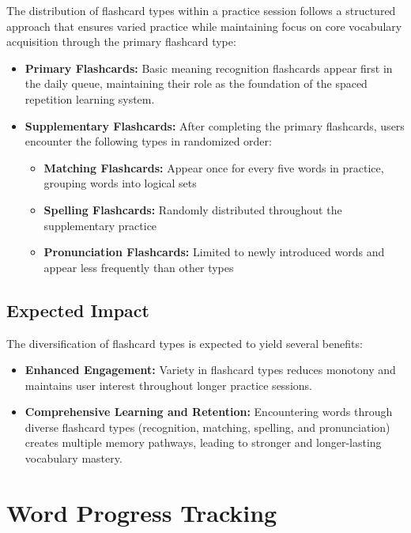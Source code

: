 The distribution of flashcard types within a practice session follows a structured approach that ensures varied practice while maintaining focus on core vocabulary acquisition through the primary flashcard type:

\begin{itemize}
    \item \textbf{Primary Flashcards:} Basic meaning recognition flashcards appear first in the daily queue, maintaining their role as the foundation of the spaced repetition learning system.
    
    \item \textbf{Supplementary Flashcards:} After completing the primary flashcards, users encounter the following types in randomized order:
    \begin{itemize}
        \item \textbf{Matching Flashcards:} Appear once for every five words in practice, grouping words into logical sets
        \item \textbf{Spelling Flashcards:} Randomly distributed throughout the supplementary practice
        \item \textbf{Pronunciation Flashcards:} Limited to newly introduced words and appear less frequently than other types
    \end{itemize}
\end{itemize}

\subsection*{Expected Impact}

The diversification of flashcard types is expected to yield several benefits:

\begin{itemize}
    \item \textbf{Enhanced Engagement:} Variety in flashcard types reduces monotony and maintains user interest throughout longer practice sessions.
    
    \item \textbf{Comprehensive Learning and Retention:} Encountering words through diverse flashcard types (recognition, matching, spelling, and pronunciation) creates multiple memory pathways, leading to stronger and longer-lasting vocabulary mastery.
    
\end{itemize}

\section{Word Progress Tracking}

